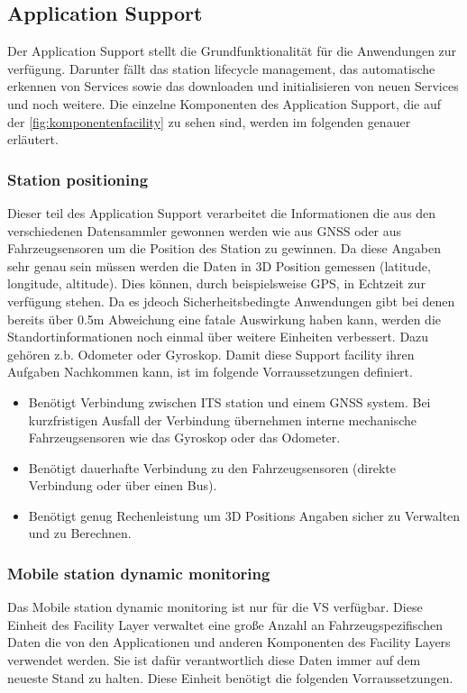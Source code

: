 \subsection{Application Support}
Der Application Support stellt die Grundfunktionalität für die Anwendungen zur verfügung. Darunter fällt das station lifecycle management, das automatische erkennen von Services sowie das downloaden und initialisieren von neuen Services und noch weitere. Die einzelne Komponenten des Application Support, die auf der \autoref{fig:komponentenfacility} zu sehen sind, werden im folgenden genauer erläutert. 

\subsubsection{Station positioning}
Dieser teil des Application Support verarbeitet die Informationen die aus den verschiedenen Datensammler gewonnen werden wie aus GNSS oder aus Fahrzeugsensoren um die Position des Station zu gewinnen. 
Da diese Angaben sehr genau sein müssen werden die Daten in 3D Position gemessen (latitude, longitude, altitude). Dies können, durch beispielsweise GPS, in Echtzeit zur verfügung stehen. Da es jdeoch Sicherheitsbedingte Anwendungen gibt bei denen bereits über 0.5m Abweichung eine fatale Auswirkung haben kann, werden die Standortinformationen noch einmal über weitere Einheiten verbessert. Dazu gehören z.b. Odometer oder Gyroskop.
Damit diese Support facility ihren Aufgaben Nachkommen kann, ist im \cite{etsi102638} folgende Vorraussetzungen definiert.

\begin{itemize}
\item Benötigt Verbindung zwischen ITS station und einem GNSS system. Bei kurzfristigen Ausfall der Verbindung übernehmen interne mechanische Fahrzeugsensoren wie das Gyroskop oder das Odometer.
\item Benötigt dauerhafte Verbindung zu den Fahrzeugsensoren (direkte Verbindung oder über einen Bus).
\item Benötigt genug Rechenleistung um 3D Positions Angaben sicher zu Verwalten und zu Berechnen.
\end{itemize}

\subsubsection{Mobile station dynamic monitoring}
Das Mobile station dynamic monitoring ist nur für die \acs{VS} verfügbar. Diese Einheit des Facility Layer verwaltet eine große Anzahl an Fahrzeugspezifischen Daten die von den Applicationen und anderen Komponenten des Facility Layers verwendet werden. Sie ist dafür verantwortlich diese Daten immer auf dem neueste  Stand zu halten. 
Diese Einheit benötigt die folgenden Vorraussetzungen.

